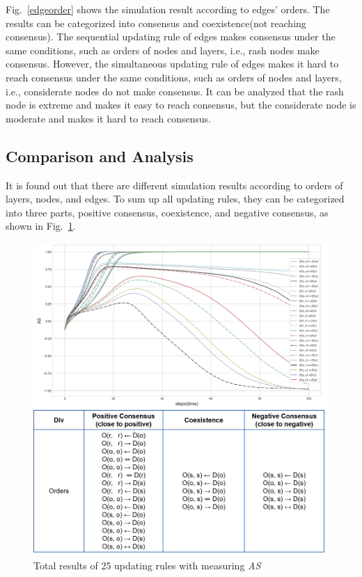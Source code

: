 Fig.~\ref{edgeorder} shows the simulation result according to edges' orders. The results can be categorized into consensus and coexistence(not reaching consensus). The sequential updating rule of edges makes consensus under the same conditions, such as orders of nodes and layers, i.e., rash nodes make consensus. However, the simultaneous updating rule of edges makes it hard to reach consensus under the same conditions, such as orders of nodes and layers, i.e., considerate nodes do not make consensus. It can be analyzed that the rash node is extreme and makes it easy to reach consensus, but the considerate node is moderate and makes it hard to reach consensus.\\
 
\subsection{Comparison and Analysis}
It is found out that there are different simulation results according to orders of layers, nodes, and edges. To sum up all updating rules, they can be categorized into three parts, positive consensus, coexistence, and negative consensus, as shown in Fig.~\ref{ordertotal}. 
 
\begin{figure}[!htb]
	\centering
	\includegraphics[width=\hsize]{figure/chap4_ordertotal.png}
	\caption{Total results of 25 updating rules with measuring \textit{AS}}
	\label{ordertotal}
\end{figure}


